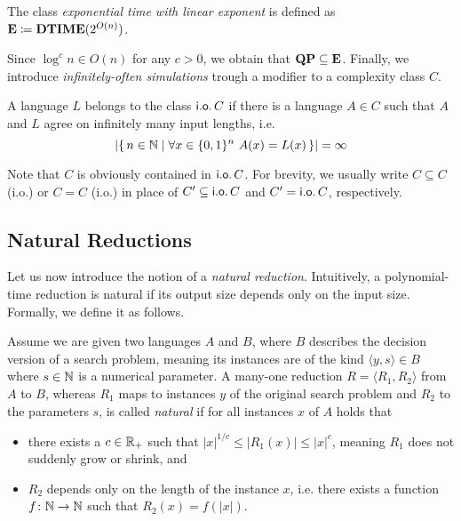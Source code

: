 \documentclass[11pt]{article}
\begin{document}
\begin{definition}
  The class \emph{exponential time with linear exponent} is defined as
	$\mathbf{E} \coloneqq \mathbf{DTIME}(2^{O(n)})$.
\end{definition}
Since $\log^c n \in O(n)$ for any $c > 0$, we obtain that
$\mathbf{QP} \subseteq \mathbf{E}$.
%
Finally, we introduce \emph{infinitely-often simulations} trough a modifier to
a complexity class $C$.
\begin{definition}
  A language $L$ belongs to the class
  $\mathsf{i.o.}\, C$ if there is a language $A \in C$ such that
  $A$ and $L$ agree on infinitely many input lengths, i.e.
  \[
    |\set{ n \in \N \mid \forall x \in \{0,1\}^n\ A(x) = L(x) }| = \infty
  \]
\end{definition}
Note that $C$ is obviously contained in $\mathsf{i.o.}\, C$.
For brevity, we usually write $C \subseteq C$ (i.o.) or $C = C$ (i.o.)
in place of $C' \subseteq \mathsf{i.o.}\, C$ and $C' = \mathsf{i.o.}\, C$, respectively.



\subsection{Natural Reductions}

Let us now introduce the notion of a \textit{natural reduction}.
Intuitively, a polynomial-time reduction is natural if its output size
depends only on the input size. Formally, we define it as follows.

\begin{definition}
  Assume we are given two languages $A$ and $B$, where $B$ describes the
  decision version of a search problem, meaning its instances are of the kind
  $\langle y, s \rangle \in B$ where $s \in {\mathbb{N}}$ is a numerical parameter.
  A many-one reduction $R = \langle R_1, R_2 \rangle$ from $A$ to $B$, whereas
  $R_1$ maps to instances $y$ of the original search problem and $R_2$ to the
  parameters $s$, is called \emph{natural} if for all instances $x$ of $A$ holds
  that
  \begin{itemize}
    \item there exists a $c \in {\mathbb R}_+$ such that
      $|x|^{1/c} \le |R_1(x)| \le |x|^c$, meaning $R_1$ does not suddenly grow or
      shrink, and
    \item $R_2$ depends only on the length of the instance $x$, i.e. there
      exists a function $f \colon {\mathbb{N}} \to {\mathbb{N}}$ such that $R_2(x) = f(|x|)$.
  \end{itemize}
\end{definition}
	
\end{document}
